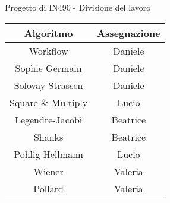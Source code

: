 \documentclass[a4paper, twoside]{article}
\begin{document}
Progetto di IN490 - Divisione del lavoro

\begin{tabular}{cc}
	\toprule
	Algoritmo & Assegnazione\\
	\midrule
	Workflow & Daniele\\
	Sophie Germain & Daniele\\
	Solovay Strassen & Daniele\\
	Square \& Multiply & Lucio\\
	Legendre-Jacobi & Beatrice\\
	Shanks & Beatrice\\
	Pohlig Hellmann & Lucio\\
	Wiener & Valeria\\
	Pollard & Valeria\\
	\bottomrule
\end{tabular}
\end{document}
